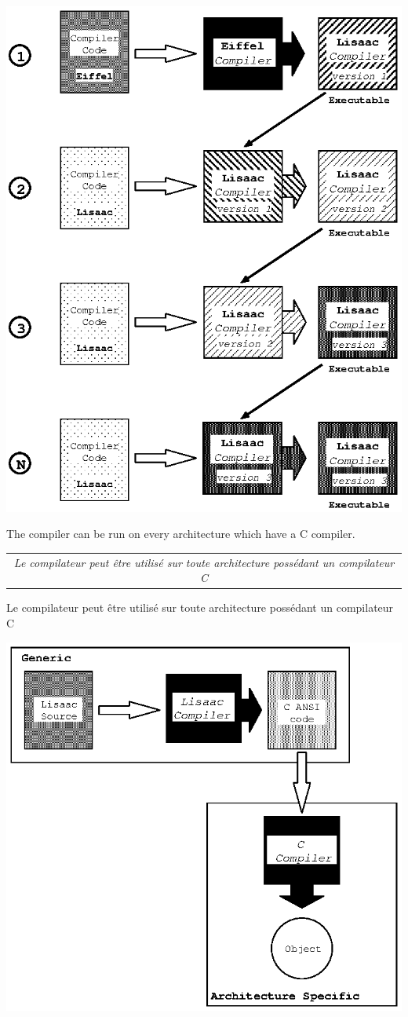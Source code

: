 \documentclass[11pt]{mybook}
\newcommand{\fr}[1]{
  \if \frenchversion 1
    \if \englishversion 1    
    \vspace{2mm}
    \noindent\begin{tabular}{|c}
      {
        \begin{minipage}{15.5cm}
          \textit{#1}
        \end{minipage}
      }
    \end{tabular}
    \else
    #1
    \fi
  \fi
}
\newcommand{\en}[1]
{
  \if \englishversion 1
  #1
  \fi
}
\begin{document}
\begin{center}
\includegraphics[scale=0.8]{figures/bootstrap}
\end{center}

\en{The compiler can be run on every architecture which have a C compiler.}

\fr{Le compilateur peut \^etre utilis\'e sur toute architecture poss\'edant un compilateur C}
\begin{center}
\includegraphics[scale=0.8]{figures/compiler}
\end{center}
\end{document}
